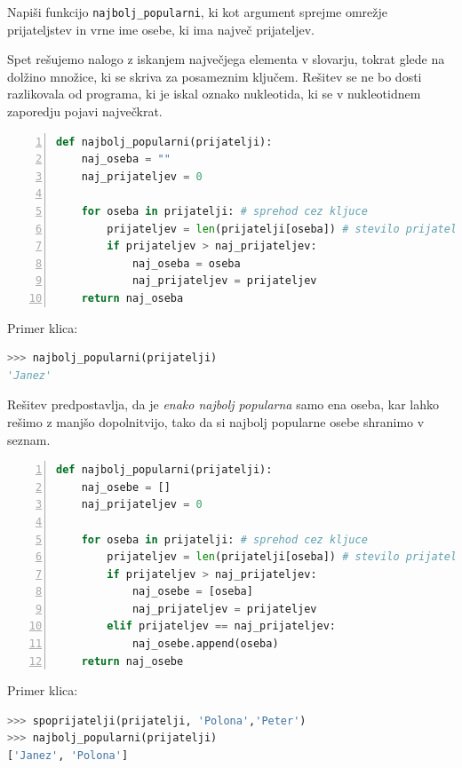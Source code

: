 \begin{zgled}
Napiši funkcijo \texttt{najbolj\_popularni}, ki kot argument sprejme omrežje prijateljstev in vrne ime osebe, ki ima največ prijateljev.
\end{zgled}
\begin{resitev}
Spet rešujemo nalogo z iskanjem največjega elementa v slovarju, tokrat glede na dolžino množice, ki se skriva za posameznim ključem. Rešitev se ne bo dosti razlikovala od programa, ki je iskal oznako nukleotida, ki se v nukleotidnem zaporedju pojavi največkrat.
\begin{lstlisting}[language=Python,numbers=left]
def najbolj_popularni(prijatelji):
    naj_oseba = ""
    naj_prijateljev = 0
    
    for oseba in prijatelji: # sprehod cez kljuce
        prijateljev = len(prijatelji[oseba]) # stevilo prijateljev
        if prijateljev > naj_prijateljev:
            naj_oseba = oseba
            naj_prijateljev = prijateljev
    return naj_oseba
\end{lstlisting}
Primer klica:
\begin{lstlisting}[language=Python]
>>> najbolj_popularni(prijatelji)
'Janez'
\end{lstlisting}

Rešitev predpostavlja, da je \emph{enako najbolj popularna} samo ena oseba, kar lahko rešimo z manjšo dopolnitvijo, tako da si najbolj popularne osebe shranimo v seznam. 
\begin{lstlisting}[language=Python,numbers=left]
def najbolj_popularni(prijatelji):
    naj_osebe = []
    naj_prijateljev = 0
    
    for oseba in prijatelji: # sprehod cez kljuce
        prijateljev = len(prijatelji[oseba]) # stevilo prijateljev
        if prijateljev > naj_prijateljev:
            naj_osebe = [oseba]
            naj_prijateljev = prijateljev
        elif prijateljev == naj_prijateljev:
            naj_osebe.append(oseba)
    return naj_osebe
\end{lstlisting}
Primer klica:
\begin{lstlisting}[language=Python]
>>> spoprijatelji(prijatelji, 'Polona','Peter')
>>> najbolj_popularni(prijatelji)
['Janez', 'Polona']
\end{lstlisting}


\end{resitev}

